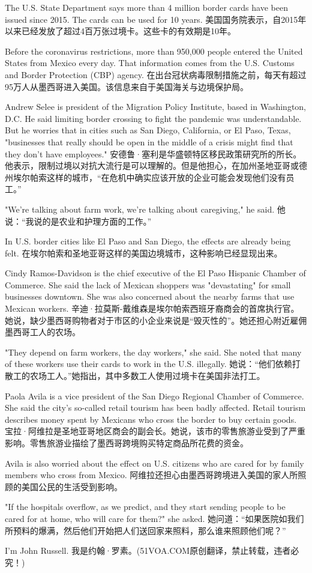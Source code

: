 The U.S. State Department says more than 4 million border cards have been issued since 2015. The cards can be used for 10 years.
美国国务院表示，自2015年以来已经发放了超过4百万张过境卡。这些卡的有效期是10年。

Before the coronavirus restrictions, more than 950,000 people entered the United States from Mexico every day. That information comes from the U.S. Customs and Border Protection (CBP) agency.
在出台冠状病毒限制措施之前，每天有超过95万人从墨西哥进入美国。该信息来自于美国海关与边境保护局。

Andrew Selee is president of the Migration Policy Institute, based in Washington, D.C. He said limiting border crossing to fight the pandemic was understandable. But he worries that in cities such as San Diego, California, or El Paso, Texas, "businesses that really should be open in the middle of a crisis might find that they don't have employees."
安德鲁·塞利是华盛顿特区移民政策研究所的所长。他表示，限制过境以对抗大流行是可以理解的。但是他担心，在加州圣地亚哥或德州埃尔帕索这样的城市，“在危机中确实应该开放的企业可能会发现他们没有员工。”

"We're talking about farm work, we're talking about caregiving," he said.
他说：“我说的是农业和护理方面的工作。”

In U.S. border cities like El Paso and San Diego, the effects are already being felt.
在埃尔帕索和圣地亚哥这样的美国边境城市，这种影响已经显现出来。

Cindy Ramos-Davidson is the chief executive of the El Paso Hispanic Chamber of Commerce. She said the lack of Mexican shoppers was "devastating" for small businesses downtown. She was also concerned about the nearby farms that use Mexican workers.
辛迪·拉莫斯-戴维森是埃尔帕索西班牙裔商会的首席执行官。她说，缺少墨西哥购物者对于市区的小企业来说是“毁灭性的”。她还担心附近雇佣墨西哥工人的农场。

"They depend on farm workers, the day workers," she said. She noted that many of these workers use their cards to work in the U.S. illegally.
她说：“他们依赖打散工的农场工人。”她指出，其中多数工人使用过境卡在美国非法打工。

Paola Avila is a vice president of the San Diego Regional Chamber of Commerce. She said the city's so-called retail tourism has been badly affected. Retail tourism describes money spent by Mexicans who cross the border to buy certain goods.
宝拉·阿维拉是圣地亚哥地区商会的副会长。她说，该市的零售旅游业受到了严重影响。零售旅游业描绘了墨西哥跨境购买特定商品所花费的资金。

Avila is also worried about the effect on U.S. citizens who are cared for by family members who cross from Mexico.
阿维拉还担心由墨西哥跨境进入美国的家人所照顾的美国公民的生活受到影响。

"If the hospitals overflow, as we predict, and they start sending people to be cared for at home, who will care for them?" she asked.
她问道：“如果医院如我们所预料的爆满，然后他们开始把人们送回家来照料，那么谁来照顾他们呢？”

I'm John Russell.
我是约翰·罗素。(51VOA.COM原创翻译，禁止转载，违者必究！)
